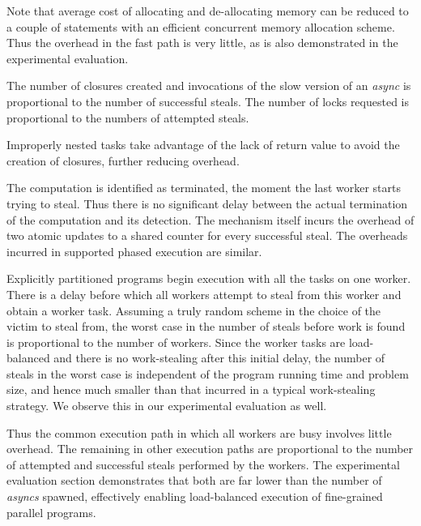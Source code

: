 Note that average cost of allocating and de-allocating memory can be
reduced to a couple of statements with an efficient concurrent memory
allocation scheme. Thus the overhead in the fast path is very
little, as is also demonstrated in the experimental evaluation.

The number of closures created and invocations of the slow version of
an \emph{async} is proportional to the number of successful steals. The
number of locks requested is proportional to the numbers of attempted
steals. 

Improperly nested tasks take advantage of the lack of return value to
avoid the creation of closures, further reducing overhead. 

The computation is identified as terminated, the moment the last
worker starts trying to steal. Thus there is no significant delay
between the actual termination of the computation and its detection.
The mechanism itself incurs the overhead of two atomic updates to a
shared counter for every successful steal. The overheads incurred in
supported phased execution are similar.

Explicitly partitioned programs begin execution with all the tasks on
one worker. There is a delay before which all workers attempt to steal
from this worker and obtain a worker task. Assuming a truly random
scheme in the choice of the victim to steal from, the worst case in
the number of steals before work is found is proportional to the
number of workers. Since the worker tasks are load-balanced and there
is no work-stealing after this initial delay, the number of steals in
the worst case is independent of the program running time and problem
size, and hence much smaller than that incurred in a typical
work-stealing strategy. We observe this in our experimental evaluation
as well. 


Thus the common execution path in which all workers are busy involves
little overhead. The remaining in other execution paths are
proportional to the number of attempted and successful steals
performed by the workers. The experimental evaluation section
demonstrates that both are far lower than the number of \emph{asyncs}
spawned, effectively enabling load-balanced execution of fine-grained
parallel programs.

